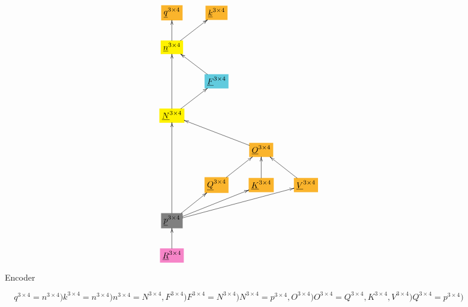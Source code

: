 \documentclass[12pt]{article}
\begin{document}
\begin{figure}[h!]\centering
$$\xymatrix{
*+[F*:Dandelion]{\underline{q}^{3\times  4}}&*+[F*:Dandelion]{\underline{k}^{3\times  4}}&&
\\
*+[F*:yellow]{\underline{n}^{3\times  4}}\ar[u]\ar[ur]&&&
\\
&*+[F*:SkyBlue]{\underline{F}^{3\times  4}}\ar[ul]&&
\\
*+[F*:yellow]{\underline{N}^{3\times  4}}\ar[uu]\ar[ur]&&&
\\
&&*+[F*:Dandelion]{\underline{O}^{3\times  4}}\ar[ull]&
\\
&*+[F*:Dandelion]{\underline{Q}^{3\times  4}}\ar[ur]&*+[F*:Dandelion]{\underline{K}^{3\times  4}}\ar[u]&*+[F*:Dandelion]{\underline{V}^{3\times  4}}\ar[ul]
\\
*+[F*:gray]{\underline{p}^{3\times  4}}\ar[uuu]\ar[ur]\ar[urr]\ar[urrr]&&&
\\
*+[F*:Lavender]{\underline{R}^{3\times  4}}\ar[u]&&&
}$$
\caption{Encoder}
\label{fig-texnn-for-encoder}
\end{figure}\begin{subequations}
\begin{equation}
q^{3\times  4} = n^{3\times  4})
\label{eq-q-fun-encoder}
\end{equation}

\begin{equation}
k^{3\times  4} = n^{3\times  4})
\label{eq-k-fun-encoder}
\end{equation}

\begin{equation}
n^{3\times  4} = N^{3\times  4},F^{3\times  4})
\label{eq-n-fun-encoder}
\end{equation}

\begin{equation}
F^{3\times  4} = N^{3\times  4})
\label{eq-F-fun-encoder}
\end{equation}

\begin{equation}
N^{3\times  4} = p^{3\times  4},O^{3\times  4})
\label{eq-N-fun-encoder}
\end{equation}

\begin{equation}
O^{3\times  4} = Q^{3\times  4},K^{3\times  4},V^{3\times  4})
\label{eq-O-fun-encoder}
\end{equation}

\begin{equation}
Q^{3\times  4} = p^{3\times  4})
\label{eq-Q-fun-encoder}
\end{equation}


\end{subequations}
\end{document}
